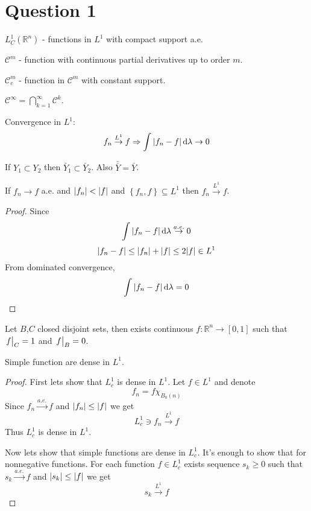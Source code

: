 
\section{Question 1}
$L^1_C(\mathbb{R}^n)$ - functions in $L^1$ with compact support a.e.

$\mathcal{C}^m$ - function with continuous partial derivatives up to order $m$.

$\mathcal{C}^m_c$ - function in $\mathcal{C}^m$ with constant support.

$\mathcal{C}^\infty = \bigcap_{k=1}^\infty \mathcal{C}^k$.


Convergence in $L^1$:
$$f_n\stackrel{L^1}{\to} f  \Rightarrow \int \abs{f_n-f} \dd{\lambda} \to 0$$

If $Y_1\subset Y_2$ then $\bar{Y}_1 \subset \bar{Y}_2$. Also $\bar{\bar{Y}} = \bar{Y}$.

\begin{lemma}
	If $f_n\to f$ a.e. and $\abs{f_n}<\abs{f}$ and $\left\{  f_n, f\right\} \subseteq L^1$ then $f_n\stackrel{L^1}{\to} f  $.
	\begin{proof}
		Since
		$$\int \abs{f_n-f} \dd{\lambda} \stackrel{a.e.}{\to} 0$$
		$$\abs{f_n-f} \leq \abs{f_n}+\abs{f} \leq 2\abs{f} \in L^1$$
		From dominated convergence,
		$$\int\abs{f_n-f} \dd{\lambda} = 0$$
	\end{proof} 
\end{lemma}


\begin{lemma} \label{urysohn}
	Let $B$,$C$ closed disjoint sets, then exists continuous $f:\mathbb{R}^n \to [0,1]$ such that $\eval{f}_C = 1$ and $\eval{f}_B=0$.
\end{lemma}
\begin{lemma}
	Simple function are dense in $L^1$.
	\begin{proof}
		First lets show that $L_c^1$ is dense in $L^1$. Let $f\in L^1$ and denote
		$$f_n = f\chi_{B_0(n)}$$
		Since $f_n \stackrel{a.e.}{\to} f$ and $\abs{f_n} \leq \abs{f}$ we get 
		$$L_c^1 \ni f_n \stackrel{L^1}{\to} f $$
		Thus $L_c^1$ is dense in $L^1$.
		
		Now lets show that simple functions are dense in $L_c^1$. It's enough to show that for nonnegative functions. For each function $f\in L^1_c$ exists sequence $s_k\geq 0$ such that $s_k \stackrel{a.e.}{\to} f$ and $\abs{s_k} \leq \abs{f}$ we get 
		$$s_k \stackrel{L^1}{\to} f $$
		
	\end{proof} 
\end{lemma}


